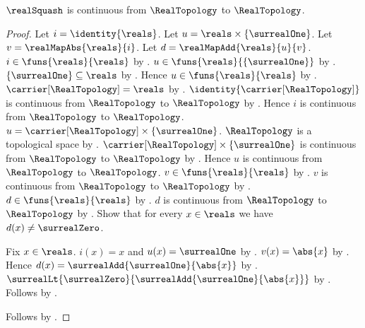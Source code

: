 \begin{theorem}\label{real_squash_continuous_real}
    $\realSquash$ is continuous from $\RealTopology$ to
        $\RealTopology$.
\end{theorem}
\begin{proof}
    Let $i=\identity{\reals}$.
    Let $u=\reals\times\{\surrealOne\}$.
    Let $v=\realMapAbs{\reals}{i}$.
    Let $d=\realMapAdd{\reals}{u}{v}$.
    $i\in\funs{\reals}{\reals}$ by .
    $u\in\funs{\reals}{\{\surrealOne\}}$
        by .
    $\{\surrealOne\}\subseteq\reals$
        by .
    Hence $u\in\funs{\reals}{\reals}$
        by .
    $\carrier[\RealTopology]=\reals$
        by .
    $\identity{\carrier[\RealTopology]}$ is continuous from
        $\RealTopology$ to $\RealTopology$
        by
        .
    Hence $i$ is continuous from $\RealTopology$ to $\RealTopology$.
    $u=\carrier[\RealTopology]\times\{\surrealOne\}$.
    $\RealTopology$ is a topological space
        by .
    $\carrier[\RealTopology]\times\{\surrealOne\}$ is continuous from
        $\RealTopology$ to $\RealTopology$
        by .
    Hence $u$ is continuous from $\RealTopology$ to $\RealTopology$.
    $v\in\funs{\reals}{\reals}$
        by .
    $v$ is continuous from $\RealTopology$ to $\RealTopology$
        by .
    $d\in\funs{\reals}{\reals}$
        by .
    $d$ is continuous from $\RealTopology$ to $\RealTopology$
        by .
    Show that for every $x\in\reals$ we have
        $d(x)\neq\surrealZero$.
    \begin{subproof}
        Fix $x\in\reals$.
        $i(x)=x$ and $u(x)=\surrealOne$
            by .
        $v(x)=\abs{x}$ by .
        Hence $d(x)=\surrealAdd{\surrealOne}{\abs{x}}$
            by .
        $\surrealLt{\surrealZero}
            {\surrealAdd{\surrealOne}{\abs{x}}}$
            by .
        Follows by .
    \end{subproof}
    Follows by
        .
\end{proof}

